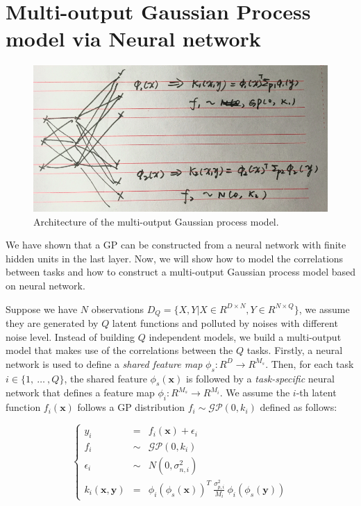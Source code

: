 \section{Multi-output Gaussian Process model via Neural network}

\begin{figure}[!htb]
    \centering
    \includegraphics[width=\columnwidth]{./img/NN-MOGP.png}
    \caption{Architecture of the multi-output Gaussian process model.}
    \label{fig:MONNGP}
\end{figure}

We have shown that a GP can be constructed from a neural network with finite hidden units in the last layer. Now, we will show how to model the correlations between tasks and how to construct a multi-output Gaussian process model based on neural network.

Suppose we have $N$ observations $D_Q = \{X, Y | X \in R^{D \times N}, Y \in R^{N \times Q}\}$, we assume they are generated by $Q$ latent functions and polluted by noises with different noise level. Instead of building $Q$ independent models, we build a multi-output model that makes use of the correlations between the $Q$ tasks. Firstly, a neural network is used to define a \emph{shared feature map} $\phi_s : R^D \rightarrow R^{M_s}$. Then, for each task $i \in \{1,~\dots~,Q\}$, the shared feature $\phi_s(\bm{x})$ is followed by a \emph{task-specific} neural network that defines a feature map $\phi_i : R^{M_s} \rightarrow R^{M_i}$. We assume the $i$-th latent function $f_i(\bm{x})$ follows a GP distribution $f_i \sim \mathcal{GP}(0, k_i)$ defined as follows:

\begin{equation}
    \label{eq:mo_kernel}
    \left\{
    \begin{array}{lll}
        y_i                 &=&    f_i(\bm{x}) + \epsilon_i  \\
        f_i                 &\sim& \mathcal{GP}(0, k_i)      \\
        \epsilon_i          &\sim& N(0, \sigma_{n, i}^2)     \\
        k_i(\bm{x}, \bm{y}) &=&    \phi_i(\phi_s(\bm{x}))^T~\frac{\sigma_{p, i}^2}{M_i}~\phi_i(\phi_s(\bm{y}))
    \end{array}
    \right.
\end{equation}

